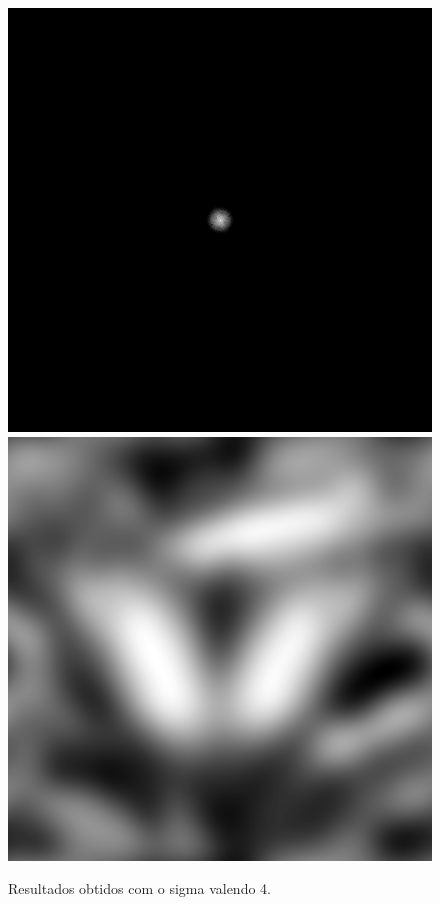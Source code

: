 \documentclass[twoside,twocolumn]{article}
\begin{document}
\begin{figure}[H]
\begin{center}
	\includegraphics[scale=.19]{figures/butterfly_mag_filter_4.png}
	\includegraphics[scale=.19]{figures/butterfly_result_4.png}
\caption{Resultados obtidos com o sigma valendo 4.} \label{mag_64}
\end{center}
\end{figure}
\end{document}

